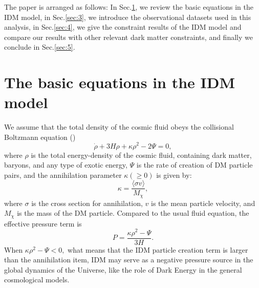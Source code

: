 \documentclass[twocolumn]{aastex631}
\begin{document}
   The paper is arranged as follows: In Sec.\ref{sec:2}, we review the basic equations in the IDM model,
   in Sec.\ref{sec:3}, we introduce the observational datasets used in this analysis, in Sec.\ref{sec:4}, 
   we give the constraint results of the IDM model and compare our results with 
   other relevant dark matter constraints, and finally we conclude in Sec.\ref{sec:5}.

\section{The basic equations in the IDM model}\label{sec:2}

   We assume that the total density of the cosmic fluid obeys
   the collisional Boltzmann equation (\cite{Kolb:1990vq})
   \begin{equation}
      \dot{\rho}+3H\rho+\kappa\rho^2-2\Psi=0,
      \label{eq:1}
   \end{equation}
   where $\rho$ is the total energy-density of the cosmic fluid,
   containing dark matter, baryons, and any type of exotic energy,
   $\Psi$ is the rate of creation of DM particle pairs, and the
   annihilation parameter $\kappa(\geq0)$ is given by:
   \begin{equation}
      \kappa=\frac{\langle\sigma v\rangle}{M_{\chi}},
      \label{eq:2}
   \end{equation}
   where $\sigma$ is the cross section for annihilation, $v$ is
   the mean particle velocity, and $M_{\chi}$ is the mass of the DM
   particle.
   Compared to the usual fluid equation, the effective pressure term
   is \begin{equation}
      P=\frac{\kappa\rho^2-\Psi}{3H}.
      \label{eq:3}
   \end{equation}
   When $\kappa\rho^2-\Psi<0,$ what means that the IDM particle
   creation term is larger than the annihilation item, IDM may serve
   as a negative pressure source in the global dynamics of the Universe,
   like the role of Dark Energy in the general cosmological models.
\end{document}

